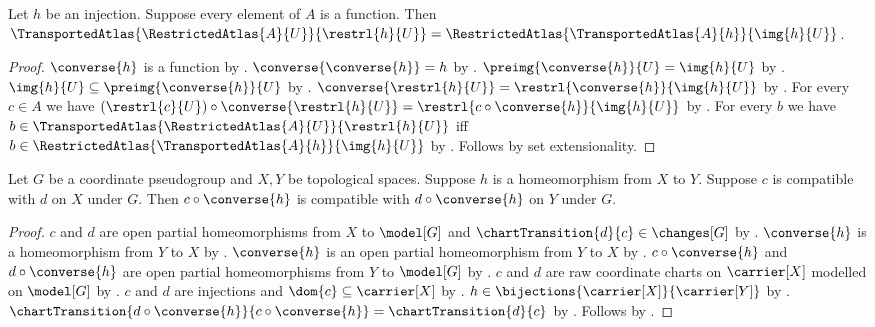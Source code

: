 \begin{theorem}\label{transported_atlas_restriction}
    Let $h$ be an injection.
    Suppose every element of $A$ is a function.
    Then $\TransportedAtlas{\RestrictedAtlas{A}{U}}{\restrl{h}{U}}
        =\RestrictedAtlas{\TransportedAtlas{A}{h}}{\img{h}{U}}$.
\end{theorem}
\begin{proof}
    $\converse{h}$ is a function by .
    $\converse{\converse{h}}=h$ by .
    $\preimg{\converse{h}}{U}=\img{h}{U}$ by .
    $\img{h}{U}\subseteq\preimg{\converse{h}}{U}$ by .
    $\converse{\restrl{h}{U}}=\restrl{\converse{h}}{\img{h}{U}}$ by .
    For every $c\in A$ we have $(\restrl{c}{U})\circ\converse{\restrl{h}{U}}
        =\restrl{c\circ\converse{h}}{\img{h}{U}}$ by .
    For every $b$ we have $b\in\TransportedAtlas{\RestrictedAtlas{A}{U}}{\restrl{h}{U}}$ iff
        $b\in\RestrictedAtlas{\TransportedAtlas{A}{h}}{\img{h}{U}}$ by
        .
    Follows by set extensionality.
\end{proof}

\begin{theorem}\label{coordinate_compatibility_transport}
    Let $G$ be a coordinate pseudogroup and $X,Y$ be topological spaces.
    Suppose $h$ is a homeomorphism from $X$ to $Y$.
    Suppose $c$ is compatible with $d$ on $X$ under $G$.
    Then $c\circ\converse{h}$ is compatible with $d\circ\converse{h}$ on $Y$ under $G$.
\end{theorem}
\begin{proof}
    $c$ and $d$ are open partial homeomorphisms from $X$ to $\model[G]$ and
        $\chartTransition{d}{c}\in\changes[G]$ by .
    $\converse{h}$ is a homeomorphism from $Y$ to $X$ by .
    $\converse{h}$ is an open partial homeomorphism from $Y$ to $X$ by
        .
    $c\circ\converse{h}$ and $d\circ\converse{h}$ are open partial homeomorphisms
        from $Y$ to $\model[G]$ by .
    $c$ and $d$ are raw coordinate charts on $\carrier[X]$ modelled on $\model[G]$ by
        .
    $c$ and $d$ are injections and $\dom{c}\subseteq\carrier[X]$ by .
    $h\in\bijections{\carrier[X]}{\carrier[Y]}$ by .
    $\chartTransition{d\circ\converse{h}}{c\circ\converse{h}}=\chartTransition{d}{c}$ by
        .
    Follows by .
\end{proof}

